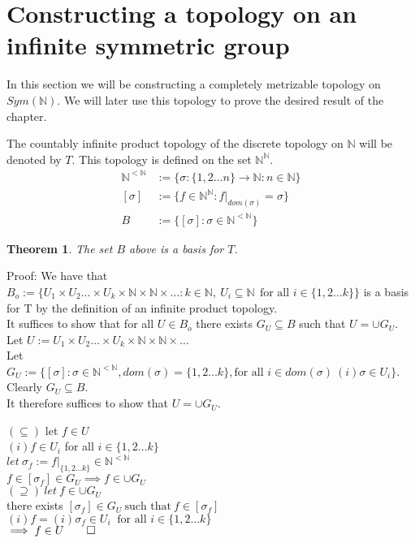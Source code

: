 \documentclass{report}
\newtheorem{theorem}{Theorem}[section]
\newenvironment{defn}[1][]{\refstepcounter{theorem}\begin{trivlist}
\item[\hskip \labelsep {\bfseries Definition  \thetheorem  \, \def\temp{#1}\ifx\temp\empty  #1\else  (#1)\fi
}]}   {\end{trivlist}}
\begin{document}
\section{Constructing a topology on an infinite symmetric group}
In this section we will be constructing a completely metrizable topology on $Sym(\mathbb{N})$. We will later use this topology to prove the desired result of the chapter.
\begin{defn}
The countably infinite product topology of the discrete topology on $\mathbb{N}$ will be denoted by $T$. This topology is defined on the set $\mathbb{N}^\mathbb{N}$.
\begin{align*}
\mathbb{N}^{<\mathbb{N}} &:= \{\sigma : \{1,2 \ldots n\}\rightarrow\mathbb{N}: n\in \mathbb{N}\}\\
[\sigma] &:= \{f\in \mathbb{N}^{\mathbb{N}} : f\vert_{dom(\sigma)} = \sigma\}\\
B&:= \{[\sigma]:\sigma \in \mathbb{N}^{<\mathbb{N}}\}
\end{align*}
\end{defn}
\begin{theorem}
The set $B$ above is a basis for $T$.
\end{theorem}\par
Proof: We have that $B_o := \{U_1\times U_2 \ldots  \times U_k \times \mathbb{N}\times\mathbb{N}\times \ldots : k\in\mathbb{N},\ U_i\subseteq \mathbb{N}\ \ \text{for all } i\in \{1,2 \ldots k\}\}$ is a basis for T by the definition of an infinite product topology.\\
It suffices to show that for all $U \in B_o$ there exists $G_U \subseteq B$ such that $U = \cup G_U$.
Let $U := U_1\times U_2 \ldots \times U_k \times \mathbb{N}\times\mathbb{N}\times \ldots$\\
 Let $G_U :=\{[\sigma]:\sigma\in\mathbb{N}^{<\mathbb{N}}, dom(\sigma)=\{1,2 \ldots k\}, \text{for all } i \in dom(\sigma)\ (i)\sigma\in U_i\}$.
Clearly $G_U \subseteq B$.\\
It therefore suffices to show that $U = \cup G_U.$
\begin{multicols}{2}
\begin{center}
$(\subseteq)$ let $f\in U$\\
$(i)f\in U_i$ for all $i\in \{1,2\ldots k\}$\\
$let\ \sigma_f := f\vert_{\{1,2 \ldots k\}}\in\mathbb{N}^{<\mathbb{N}}$\\
$f\in [\sigma_f] \in G_U 
\implies f\in \cup G_U$\\
$(\supseteq)\ let\ f\in \cup G_U$\\
there exists $[\sigma_f]\in G_U \ \text{such that} \ f\in [\sigma_f]$\\
$(i)f = (i)\sigma_f \in U_i\ \text{ for all } i \in \{1,2 \ldots k\}$\\
$\implies f\in U \qed$\\
\end{center}
\end{multicols}
\end{document}

